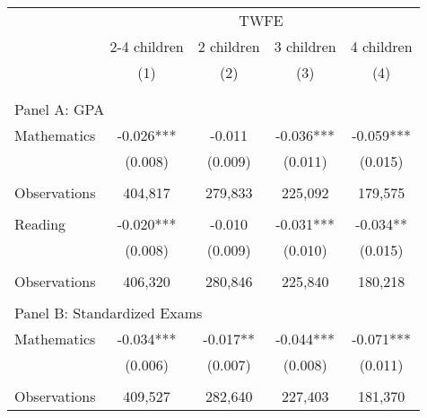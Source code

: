 \makeatletter
{}
{
\makeatother
\begin{tabular}{lcccc}
\toprule
\cmidrule(lr){2-5}
& \multicolumn{4}{c}{TWFE} \\
\cmidrule(lr){2-5}
& 2-4 children & 2 children & 3 children & 4 children  \\
\cmidrule(lr){2-2} \cmidrule(lr){3-3} \cmidrule(lr){4-4} \cmidrule(lr){5-5}
& (1) & (2) & (3) & (4) \\
\bottomrule
&  &  & &  \\
&  &  & &  \\
\multicolumn{5}{l}{Panel A: GPA } \\
Mathematics         &      -0.026***&      -0.011   &      -0.036***&      -0.059***\\
                    &     (0.008)   &     (0.009)   &     (0.011)   &     (0.015)   \\
                    &               &               &               &               \\
Observations        &     404,817   &     279,833   &     225,092   &     179,575   \\
 
&  &  & &  \\
Reading             &      -0.020***&      -0.010   &      -0.031***&      -0.034** \\
                    &     (0.008)   &     (0.009)   &     (0.010)   &     (0.015)   \\
                    &               &               &               &               \\
Observations        &     406,320   &     280,846   &     225,840   &     180,218   \\
 
&  &  & &  \\
\multicolumn{5}{l}{Panel B: Standardized Exams } \\
Mathematics         &      -0.034***&      -0.017** &      -0.044***&      -0.071***\\
                    &     (0.006)   &     (0.007)   &     (0.008)   &     (0.011)   \\
                    &               &               &               &               \\
Observations        &     409,527   &     282,640   &     227,403   &     181,370   \\
 

\end{tabular}}
